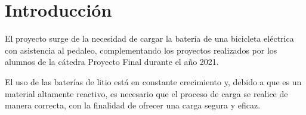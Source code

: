 \section{Introducción}

El proyecto surge de la necesidad de cargar la batería de una bicicleta eléctrica con asistencia al pedaleo,
complementando los proyectos realizados por los alumnos de la cátedra Proyecto Final durante el año 2021.

El uso de las baterías de litio está en constante crecimiento y,
debido a que es un material altamente reactivo,
es necesario que el proceso de carga se realice de manera correcta,
con la finalidad de ofrecer una carga segura y eficaz.